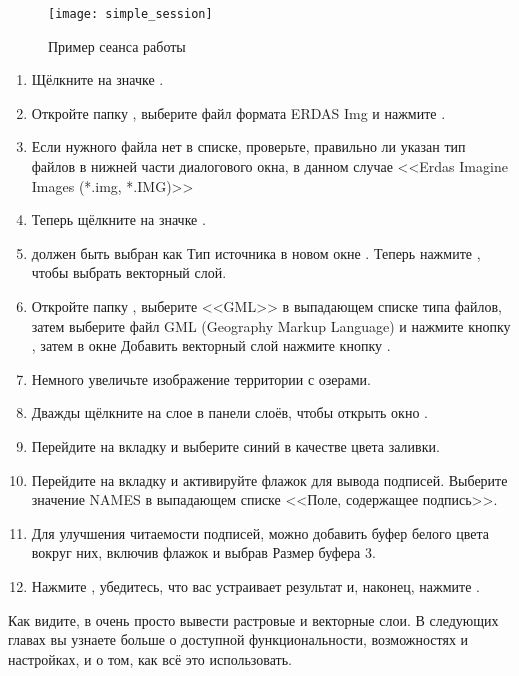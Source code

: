 \begin{figure}[ht]
   \centering
   \texttt{[image: simple\_session]}
   \caption{Пример сеанса работы \qg \nixcaption}\label{fig:simple_session}
\end{figure}


{\setlength{\baselineskip}{1.3\baselineskip}
\begin{enumerate}[itemsep=2pt]
\item Щёлкните на значке .
\item Откройте папку , выберите файл
формата ERDAS Img  и нажмите .
\item Если нужного файла нет в списке, проверьте, правильно ли указан
тип файлов в нижней части диалогового окна, в данном случае
<<Erdas Imagine Images (*.img, *.IMG)>>
\item Теперь щёлкните на значке .
\item {} должен быть выбран как Тип источника в
новом окне . Теперь нажмите ,
чтобы выбрать векторный слой.
\item Откройте папку , выберите <<GML>>
в выпадающем списке типа файлов, затем выберите файл GML (Geography Markup
Language)  и нажмите кнопку , затем в окне
Добавить векторный слой нажмите кнопку .
\item Немного увеличьте изображение территории с озерами.
\item Дважды щёлкните на слое  в панели слоёв, чтобы открыть
окно .
\item Перейдите на вкладку  и выберите синий в качестве
цвета заливки.
\item Перейдите на вкладку  и активируйте флажок
 для вывода подписей. Выберите значение
NAMES в выпадающем списке <<Поле, содержащее подпись>>.
\item Для улучшения читаемости подписей, можно добавить буфер белого
цвета вокруг них, включив флажок  и
выбрав Размер буфера 3.
\item Нажмите , убедитесь, что вас устраивает результат и,
наконец, нажмите .
\end{enumerate}
\par}
Как видите, в \qg очень просто вывести растровые и векторные слои. В следующих
главах вы узнаете больше о доступной функциональности, возможностях и настройках, и о том,
как всё это использовать.

\FloatBarrier
